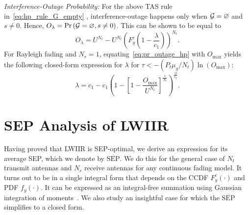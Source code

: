 \documentclass[12pt,draftcls,peerreview,onecolumn]{IEEEtran}
\newcommand{\brac}[1]{\left({#1}\right)}
\newcommand{\tendsto}{\to}
\newcommand{\prob}[1]{\text{Pr}\brac{#1}}
\newcommand{\SEP}{\text{SEP}}
\newcommand{\nx}{{0}}
\newcommand{\lam}{\lambda}
\newcommand{\mug}{{\mu_{g}}}
\newcommand{\goodset}{\cal{G}}
\newcommand{\Nt}{{N_t}}
\newcommand{\Nr}{{N_r}}
\newcommand{\Pt}{{P_t}}
\newcommand{\outmax}{O_{\text{max}}}
\newcommand{\itau}{\tau}
\newcommand{\cone}{c_{1}}
\newcommand{\ctwo}{c_{2}}
\newcommand{\out}{O}
\newcommand{\lambym}{\frac{\lam}{\cone}}
\newcommand{\al}{\ctwo}
\newcommand{\snr}{\Omega}
\newcommand{\albysnr}[1][]{\frac{\al#1}{\snr}}
\newcommand{\snrbyal}[1][]{\frac{\snr#1}{\al}}
\newcommand{\un}{U}
\newcommand{\outlam}{\out_{\lam}}
\newcommand{\avgSEP}{\overline{\SEP}}
\newcommand{\nullset}{\varnothing}
\newcommand{\ccdfyrv}[1]{ F^{c}_{y}\left(#1 \right) }
\newcommand{\pdfy}[1]{ f_{y}\left( #1 \right) }
\begin{document}
{\em Interference-Outage Probability:} For the above TAS rule in~\eqref{eq:hp_rule_G_empty} , interference-outage happens only when $\goodset=\nullset$ and  $s\neq\nx$. Hence,  $\outlam=\prob{{\goodset}=\nullset, s \neq 0}$. This can be shown to be equal to
\begin{equation}
\label{eq:pr_outage_hp}
\outlam = \un^{\Nt} - \un^{\Nt}\left(\ccdfyrv{1-\lambym} \right)^{\Nt}.
\end{equation}
%
For Rayleigh fading and $\Nr=1$, equating~\eqref{eq:pr_outage_hp} with $\outmax$ yields the following closed-form expression for $\lam$ for $\itau<-\left({\Pt\mug}/{\Nt}\right) \ln\left({\outmax}\right)$: 
\begin{equation}
\label{eq:lam_asym}
\lam  =  \cone - \cone\left(1 - \left[1 - \frac{\outmax}{\un^{\Nt}}\right]^{\frac{1}{\Nt}} \right)^{\snrbyal[]}.
\end{equation}
%




\section{SEP Analysis of LWIIR}
\label{sec:SEPanalysis}
Having proved that LWIIR is SEP-optimal, we derive an expression for its average SEP, which we denote by  $\avgSEP$. We do this for the general case of $\Nt$ transmit antennas and $\Nr$ receive antennas for any continuous fading model. It turns out to be in a single integral form that depends on the CCDF $\ccdfyrv{\cdot}$ and PDF $\pdfy{\cdot}$. It can be expressed as an integral-free summation using Gaussian integration of moments~\cite[pp 921-922]{abramowitz_stegun}. We also study an insightful case for which the $\avgSEP$ simplifies to a closed form. %
 
\end{document}
